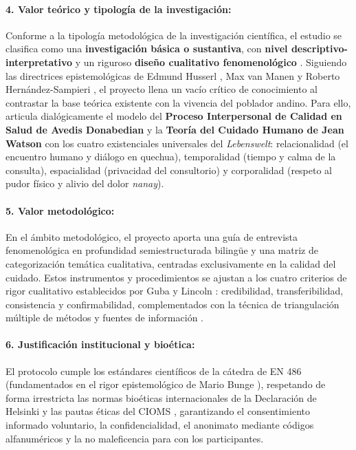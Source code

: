 \paragraph{4. Valor teórico y tipología de la investigación:}
Conforme a la tipología metodológica de la investigación científica, el estudio se clasifica como una \textbf{investigación básica o sustantiva}, con \textbf{nivel descriptivo-interpretativo} y un riguroso \textbf{diseño cualitativo fenomenológico} \cite{sampieri2018, creswell2013}. Siguiendo las directrices epistemológicas de Edmund Husserl \cite{husserl1949}, Max van Manen \cite{vanmanen1990} y Roberto Hernández-Sampieri \cite{sampieri2018}, el proyecto llena un vacío crítico de conocimiento al contrastar la base teórica existente con la vivencia del poblador andino. Para ello, articula dialógicamente el modelo del \textbf{Proceso Interpersonal de Calidad en Salud de Avedis Donabedian} \cite{donabedian1980, donabedian2005} y la \textbf{Teoría del Cuidado Humano de Jean Watson} \cite{watson2008} con los cuatro existenciales universales del \textit{Lebenswelt}: relacionalidad (el encuentro humano y diálogo en quechua), temporalidad (tiempo y calma de la consulta), espacialidad (privacidad del consultorio) y corporalidad (respeto al pudor físico y alivio del dolor \textit{nanay}).

\paragraph{5. Valor metodológico:}
En el ámbito metodológico, el proyecto aporta una guía de entrevista fenomenológica en profundidad semiestructurada bilingüe y una matriz de categorización temática cualitativa, centradas exclusivamente en la calidad del cuidado. Estos instrumentos y procedimientos se ajustan a los cuatro criterios de rigor cualitativo establecidos por Guba y Lincoln \cite{gubalincoln1985}: credibilidad, transferibilidad, consistencia y confirmabilidad, complementados con la técnica de triangulación múltiple de métodos y fuentes de información \cite{okuda2005}.

\paragraph{6. Justificación institucional y bioética:}
El protocolo cumple los estándares científicos de la cátedra de EN 486 (fundamentados en el rigor epistemológico de Mario Bunge \cite{bunge2014}), respetando de forma irrestricta las normas bioéticas internacionales de la Declaración de Helsinki \cite{helsinki2013} y las pautas éticas del CIOMS \cite{cioms2016}, garantizando el consentimiento informado voluntario, la confidencialidad, el anonimato mediante códigos alfanuméricos y la no maleficencia para con los participantes.

\newpage
